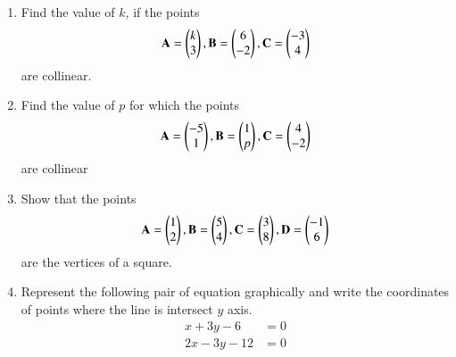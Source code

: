 \renewcommand{\theequation}{\theenumi}
\begin{enumerate}[label=\thesection.\arabic*.,ref=\thesection.\theenumi]

\item Find the value of $k$, if the points
\begin{align}
\mathbf {A}=\begin{pmatrix}k\\3\end{pmatrix},
\mathbf {B}=\begin{pmatrix}6\\-2\end{pmatrix},
\mathbf {C}=\begin{pmatrix}-3\\4\end{pmatrix}
\end{align}
are collinear.
\\
\solution

%
\item Find the value of $p$ for which the points
\begin{align}
\mathbf {A}=\begin{pmatrix}-5\\1\end{pmatrix},
\mathbf {B}=\begin{pmatrix}1\\p\end{pmatrix},
\mathbf {C}=\begin{pmatrix}4\\-2\end{pmatrix}
\end{align}
are collinear
\\
\solution


\item Show that the points 
\begin{align}
\mathbf {A}=\begin{pmatrix}1\\2\end{pmatrix},
\mathbf {B}=\begin{pmatrix}5\\4\end{pmatrix},
\mathbf {C}=\begin{pmatrix}3\\8\end{pmatrix},
\mathbf {D}=\begin{pmatrix}-1\\6\end{pmatrix}
\end{align}
are the vertices of a square.
\\
\solution

\item Represent the following pair of equation graphically and write the coordinates of points where the line is intersect $y$ axis.
\begin{align}
    x+3y-6&=0 \\
2x-3y-12&=0 
\end{align} 
\\
\solution



\end{enumerate}